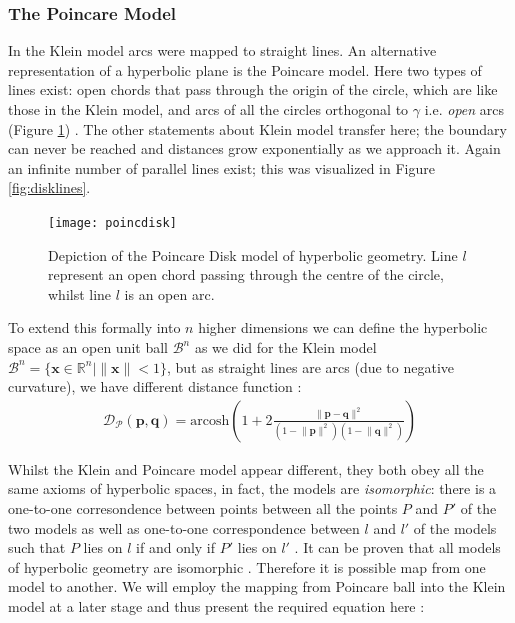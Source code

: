 \documentclass[12pt]{report}
\begin{document}
\subsubsection{The Poincare Model}
In the Klein model arcs were mapped to straight lines. An alternative representation of a hyperbolic plane is the Poincare model. Here two types of lines exist: open chords that pass through the origin of the circle, which are like those in the Klein model, and arcs of all the circles orthogonal to $\gamma$ i.e. \textit{open} arcs (Figure \ref{fig:pdisk}) \cite{Greenberg1994}. The other statements about Klein model transfer here; the boundary can never be reached and distances grow exponentially as we approach it. Again an infinite number of parallel lines exist; this was visualized in Figure \ref{fig:disklines}.

\begin{figure}
  \centering
	\texttt{[image: poincdisk]}
	\caption{Depiction of the Poincare Disk model of hyperbolic geometry. Line $l$ represent an open chord passing through the centre of the circle, whilst line $l$ is an open arc.
}
	\label{fig:pdisk}
\end{figure}

To extend this formally into $n$ higher dimensions we can define the hyperbolic space as an open unit ball $\mathcal{B}^n$ as we did for the Klein model $\mathcal{B}^n = \{\mathbf{x} \in \mathbb{R}^n | \lVert \mathbf{x} \rVert <1 \}$, but as straight lines are arcs (due to negative curvature), we have different distance function \cite{Iversen1992}:
\begin{align}
  \mathcal{D_P}(\mathbf{p}, \mathbf{q}) = \text{arcosh} \left(1 + 2 \frac{\lVert \mathbf{p} - \mathbf{q} \rVert^2}{(1-\lVert \mathbf{p}\rVert^2)(1-\lVert \mathbf{q}\rVert^2)}   \right) 
  \label{eq:pdist}
\end{align}

Whilst the Klein and Poincare model appear different, they both obey all the same axioms of hyperbolic spaces, in fact, the models are \textit{isomorphic}: there is a one-to-one corresondence between points between all the points $P$ and $P'$ of the two models as well as one-to-one correspondence between $l$ and $l'$ of the models such that $P$ lies on $l$ if and only if $P'$ lies on $l'$ \cite{Greenberg1994}. It can be proven that all models of hyperbolic geometry are isomorphic \cite{Greenberg1994}. Therefore it is possible map from one model to another. We will employ the mapping from Poincare ball into the Klein model at a later stage and thus present the required equation here \cite{Greenberg1994}:
\end{document}

